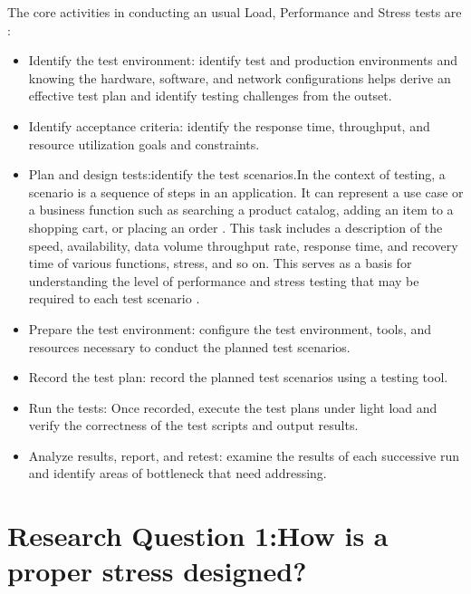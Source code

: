 The core activities in conducting an usual Load, Performance and Stress tests are \cite{Erinle2013}: 

\begin{itemize}
\item Identify the test environment: identify test and production environments and knowing the hardware, software, and network configurations helps derive an effective test plan and identify testing challenges from the outset.

\item Identify acceptance criteria: identify the response time, throughput, and resource utilization goals and constraints.

\item Plan and design tests:identify the test scenarios.In the context of testing, a scenario is a sequence of steps in an application. It can represent a use case or a business function such as searching a product catalog, adding an item to a shopping cart, or placing an order \cite{Corporation2007}. This task includes a description
of the speed, availability, data volume throughput rate, response
time, and recovery time of various functions, stress, and so on. This
serves as a basis for understanding the level of performance and
stress testing that may be required to each test scenario \cite{Lewis2005}.

\item Prepare the test environment: configure the test environment, tools, and resources necessary to conduct the planned test scenarios.

\item Record the test plan: record the planned test scenarios using a testing tool.

\item Run the tests: Once recorded, execute the test plans under light load and verify the correctness of the test scripts and output results.

\item Analyze results, report, and retest: examine the results of each successive run and identify areas of bottleneck that need addressing.  

\end{itemize}





\section{Research Question 1:How is a proper stress designed?}

